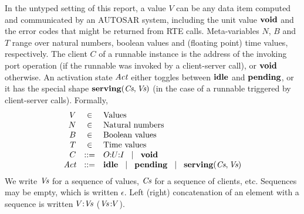 \documentclass[twocolumn]{article}
\newcommand{\V}[1]{\mbox{\it #1}}
\newcommand{\Act}{\V{Act}}
\newcommand{\Vs}{\V{Vs}}
\newcommand{\Cs}{\V{Cs}}
\newcommand{\void}{\mbox{\bf void}}
\newcommand{\idle}{\mbox{\bf idle}}
\newcommand{\pending}{\mbox{\bf pending}}
\newcommand{\serving}[2]{\mbox{\bf serving}(#1,#2)}
\newcommand{\seq}[2]{#1\hspace{-0.7ex}:\hspace{-0.7ex}#2}
\newcommand{\seqq}[3]{#1\hspace{-0.7ex}:\hspace{-0.7ex}#2\hspace{-0.7ex}:\hspace{-0.7ex}#3}
\newcommand{\sep}{\hspace{2ex}|\hspace{2ex}}
\begin{document}
In the untyped setting of this report, a value $V$ can be any data item computed and communicated by an AUTOSAR system, including the unit value $\void$ and the error codes that might be returned from RTE calls. Meta-variables $N$, $B$ and $T$ range over natural numbers, boolean values and (floating point) time values, respectively. The client $C$ of a runnable instance is the address of the invoking port operation (if the runnable was invoked by a client-server call), or $\void$ otherwise. An activation state $\Act$ either toggles between $\idle$ and $\pending$, or it has the special shape $\serving{\Cs}{\Vs}$ (in the case of a runnable triggered by client-server calls). Formally,
$$
\begin{array}{rcll}
	V	& \in		& \mbox{Values} \\
	N	& \in		& \mbox{Natural numbers} \\
	B	& \in		& \mbox{Boolean values} \\
	T	& \in		& \mbox{Time values} \\
	C	& ::=		& \seqq{O}{U}{I} \sep \void \\
	\Act	& ::=		& \idle \sep \pending \sep \serving{\Cs}{\Vs} \\
\end{array}
$$
We write $\Vs$ for a sequence of values, $\Cs$ for a sequence of clients, etc. Sequences may be empty, which is written $\epsilon$. Left (right) concatenation of an element with a sequence is written $\seq{V}{\Vs}$ ($\seq{\Vs\,}{V}$). 
\end{document}

